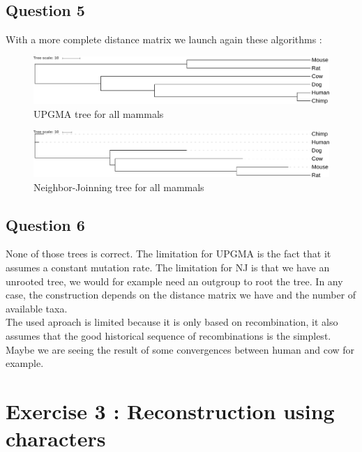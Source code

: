 \documentclass[]{article}
\theoremstyle{definition}
\begin{document}
\subsection{Question 5}

With a more complete distance matrix we launch again these algorithms :

\begin{figure}[h!]
	\includegraphics*[width = \linewidth]{../files/UPGMA.pdf}
	\caption{\label{upgma2} UPGMA tree for all mammals }
\end{figure}

\begin{figure}[h!]
	\includegraphics*[width = \linewidth]{../files/NJ.pdf}
	\caption{\label{nj2} Neighbor-Joinning tree for all mammals }
\end{figure}

\subsection{Question 6}

None of those trees is correct. The limitation for UPGMA is the fact that it assumes a constant mutation rate. The limitation for NJ is that we have an unrooted tree, we would for example need an outgroup to root the tree. In any case, the construction depends on the distance matrix we have and the number of available taxa.\\

The used aproach is limited because it is only based on recombination, it also assumes that the good historical sequence of recombinations is the simplest. Maybe we are seeing the result of some convergences between human and cow for example.


\section{Exercise 3 : Reconstruction using characters}
\end{document}
